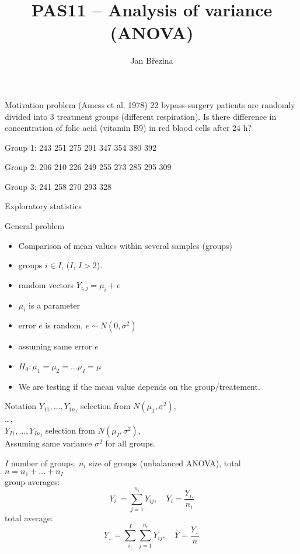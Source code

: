 \documentclass[smaller]{beamer}
\title{PAS11 -- Analysis of variance (ANOVA)}
\author{Jan B\v rezina}
\institute %
{
  Technical University of Liberec
}
\def\ol#1{\overline{#1}}
\def\xskip{{\vspace{2ex}}}
\begin{document}
\begin{frame}
  \titlepage
\end{frame}

\begin{frame}{Motivation problem}
(Amess et al. 1978) 22 bypass-surgery patients are randomly
divided into 3 treatment groups (different respiration). Is there difference in concentration of folic acid 
(vitamin B9) in red blood cells after 24 h?

\xskip
Group 1:
 243 
 251
 275
 291
 347
 354
 380
 392

Group 2:
 206
 210
 226
 249
 255
 273
 285
 295
 309

Group 3:
 241
 258
 270
 293
 328

\end{frame}

\begin{frame}{Exploratory statistics}
\end{frame}
\begin{frame}{General problem}
  \begin{itemize}
   \item Comparison of mean values within several samples (groups)\\
   \item groups $i \in I$, ($I$, $I>2$).\\
   \item random vectors $Y_{i,j} = \mu_i+e$
   \item $\mu_i$ is a parameter
   \item error $e$ is random, $e \sim N(0,\sigma^2)$
   \item assuming same error $e$ 
   \item $H_0: \mu_1=\mu_2=\dots\mu_I=\mu$      
   \item We are testing if the mean value depends on the group/treatement.
 
  \end{itemize}

\end{frame}

\begin{frame}{Notation}
 $Y_{11}, \dots, Y_{1n_1}$ selection from $N(\mu_1, \sigma^2)$,\\
 \dots,\\
 $Y_{I1}, \dots, Y_{In_I}$ selection from $N(\mu_I, \sigma^2)$,\\
 Assuming same variance $\sigma^2$ for all groups.

\xskip
$I$ number of groups, $n_i$ size of groups (unbalanced ANOVA), total $n = n_1 + \dots + n_I$\\
group averages:
\[
 Y_{i.} = \sum_{j=1}^{n_i} Y_{ij},\quad \ol{Y}_i = \frac{Y_{i.}}{n_i}
\]
total average:
\[
 Y_{..} = \sum_{i_1}^{I}\sum_{j=1}^{n_i} Y_{ij},\quad \ol{Y} = \frac{Y_{..}}{n}
\]
\end{frame}
\end{document}
